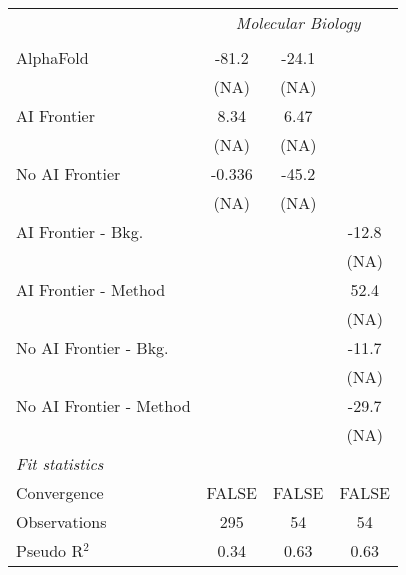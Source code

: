 \begin{tabular}{lccc}
 & \multicolumn{3}{c}{\textit{Molecular Biology}} \\ \\
   AlphaFold               & -81.2  & -24.1 &   \\   
                           & (NA)   & (NA)  &   \\   
   AI Frontier             & 8.34   & 6.47  &   \\   
                           & (NA)   & (NA)  &   \\   
   No AI Frontier          & -0.336 & -45.2 &   \\   
                           & (NA)   & (NA)  &   \\   
   AI Frontier - Bkg.      &        &       & -12.8\\   
                           &        &       & (NA)\\   
   AI Frontier - Method    &        &       & 52.4\\   
                           &        &       & (NA)\\   
   No AI Frontier - Bkg.   &        &       & -11.7\\   
                           &        &       & (NA)\\   
   No AI Frontier - Method &        &       & -29.7\\   
                           &        &       & (NA)\\   
   \midrule
   \emph{Fit statistics}\\
   Convergence             &FALSE   & FALSE & FALSE\\  
   Observations            & 295    & 54    & 54\\  
   Pseudo R$^2$            & 0.34   & 0.63  & 0.63\\  
   

\end{tabular}
